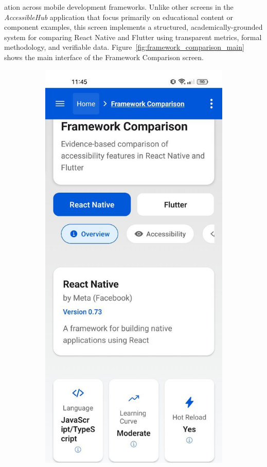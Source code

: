 ation across mobile development frameworks. Unlike other screens in the \textit{AccessibleHub} application that focus primarily on educational content or component examples, this screen implements a structured, academically-grounded system for comparing React Native and Flutter using transparent metrics, formal methodology, and verifiable data. Figure~\ref{fig:framework_comparison_main} shows the main interface of the Framework Comparison screen.

\begin{figure}[ht]
    \centering
    \begin{subfigure}[b]{0.48\textwidth}
        \centering
        \includegraphics[width=\linewidth, alt={Framework Comparison Screen with React Native selected}]{img/overview1.jpg}

\end{subfigure}
\end{figure}
